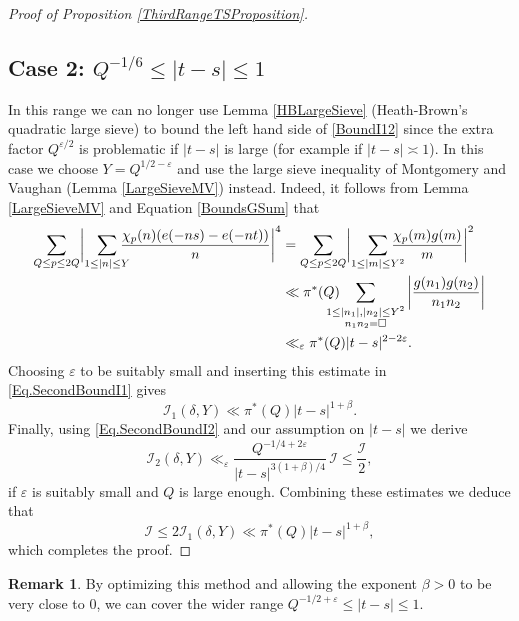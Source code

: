 \documentclass[10pt]{amsart}
\theoremstyle{plain}
\theoremstyle{definition}
\newtheorem{rem}[thm]{Remark}
\let\ep\varepsilon
\begin{document}
\begin{proof}[Proof of Proposition \ref{ThirdRangeTSProposition}]
\subsection*{Case 2: $Q^{-1/6}\leq|t-s|\leq 1$}
In this range we can no longer use Lemma \ref{HBLargeSieve} (Heath-Brown's quadratic large sieve) to bound the left hand side of \eqref{BoundI12} since the extra factor $Q^{\ep/2}$ is problematic if $|t-s|$ is large (for example if $|t-s|\asymp 1$). In this case we choose $Y= Q^{1/2-\ep}$ and use the large sieve inequality of Montgomery and Vaughan (Lemma \ref{LargeSieveMV}) instead. Indeed, it follows from Lemma \ref{LargeSieveMV} and Equation \eqref{BoundsGSum} that
\begin{equation}\label{BoundI13}
\begin{aligned}
\sum_{Q\leq p\leq 2Q} \biggl|\sum_{1\leq |n|\leq Y}\hspace*{-3mm} \frac{\chi_p(n) (e(-ns)-e(-nt))}{n} \biggl|^4
&= \sum_{Q\leq p\leq 2Q} \biggl|\sum_{1\leq |m|\leq Y^2}\hspace*{-4mm} \frac{\chi_p(m)g(m)}{m} \biggr|^2 \\
&\ll \pi^*(Q)\hspace*{-4mm} \sum_{\substack{1\leq |n_1|, |n_2|\leq Y^2\\ n_1n_2=\square}} \left|\frac{g(n_1)g(n_2)}{n_1n_2}\right| \\
&\ll_{\ep} \pi^*(Q)|t-s|^{2-2\ep}.
\end{aligned}
\end{equation}
Choosing $\ep$ to be suitably small and inserting this estimate in \eqref{Eq.SecondBoundI1} gives
\[
\mathcal{I}_1(\delta, Y) \ll \pi^{*}(Q)|t-s|^{1+\beta}. \]
Finally, using \eqref{Eq.SecondBoundI2} and our assumption on $|t-s|$ we derive
\[
\mathcal{I}_2(\delta, Y) \ll_{\ep} \frac{Q^{-1/4+2\ep}} {|t-s|^{3(1+\beta)/4}}\, \mathcal{I} \leq \frac{\mathcal{I}}{2}, \]
if $\ep$ is suitably small and $Q$ is large enough. Combining these estimates we deduce that
\[\mathcal{I}\leq 2 \mathcal{I}_1(\delta, Y) \ll \pi^{*}(Q)|t-s|^{1+\beta}, \]
which completes the proof.
\end{proof}

\begin{rem}\label{Rem.FinalRange}
By optimizing this method and allowing the exponent $\beta>0$ to be very close to $0$, we can cover the wider range $Q^{-1/2+\ep} \leq |t-s|\leq 1$.
\end{rem}
\end{document}
